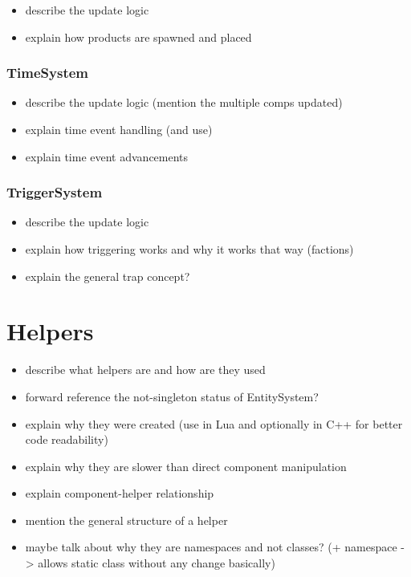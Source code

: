 \begin{itemize}
    \item describe the update logic
    \item explain how products are spawned and placed
\end{itemize}

\subsubsection{TimeSystem}

\begin{itemize}
    \item describe the update logic (mention the multiple comps updated)
    \item explain time event handling (and use)
    \item explain time event advancements
\end{itemize}

\subsubsection{TriggerSystem}

\begin{itemize}
    \item describe the update logic
    \item explain how triggering works and why it works that way (factions)
    \item explain the general trap concept?
\end{itemize}

\section{Helpers}

\begin{itemize}
    \item describe what helpers are and how are they used
    \item forward reference the not-singleton status of EntitySystem?
    \item explain why they were created (use in Lua and optionally in C++
        for better code readability)
    \item explain why they are slower than direct component manipulation
    \item explain component-helper relationship
    \item mention the general structure of a helper
    \item maybe talk about why they are namespaces and not classes?
        (+ namespace -> allows static class without any change basically)
\end{itemize}

